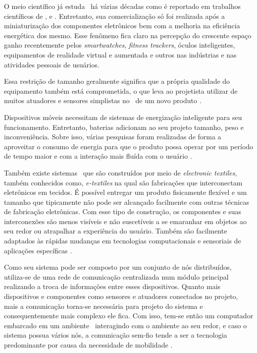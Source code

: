        O meio científico já estuda \wearables\ há várias décadas como é reportado em trabalhos científicos de \citet{Sutherland1968}, \citet{Mann1996} e \citet{Mann1997}.
        Entretanto, sua comercialização só foi realizada após a miniaturização dos componentes eletrônicos bem com a melhoria na eficiência energética dos mesmo.
        Esse fenômeno fica claro na percepção do crescente espaço ganho recentemente pelos \textit{smartwatches}, \textit{fitness trackers}, óculos inteligentes, equipamentos de realidade virtual e aumentada e outros nas indústrias e nas atividades pessoais de usuários.
        
        Essa restrição de tamanho geralmente significa que a própria qualidade do equipamento também está comprometida, o que leva ao projetista utilizar de muitos atuadores e sensores simplistas no \design\ de um novo produto \citep{VanLaerhoven2002}.
        
        Dispositivos móveis necessitam de sistemas de energização inteligente para seu funcionamento.
        Entretanto, baterias adicionam ao seu projeto tamanho, peso e inconveniência.
        Sobre isso, várias pesquisas foram realizadas de forma a aproveitar o consumo de energia para que o produto possa operar por um período de tempo maior e com a interação mais fluída com o usuário \citep{starner1996human}.
        
        
        Também existe sistemas \wearables\ que são construídos por meio de \textit{electronic textiles}, também conhecidos como, \textit{e-textiles} na qual são fabricações que interconectam eletrônicos em tecidos.
        É possível entregar um produto fisicamente flexível e um tamanho que tipicamente não pode ser alcançado facilmente com outras técnicas de fabricação eletrônicas.
        Com esse tipo de construção, os componentes e suas interconexões são menos visíveis e não suscetíveis a se emaranhar em objetos ao seu redor ou atrapalhar a experiência do usuário.
        Também são facilmente adaptados às rápidas mudanças em tecnologias computacionais e sensoriais de aplicações específicas \citep{starner1996human}.
        
        
        Como seu sistema pode ser composto por um conjunto de nós distribuídos, utiliza-se de uma rede de comunicação centralizada num módulo principal realizando a troca de informações entre esses dispositivos.
        Quanto mais dispositivos e componentes como sensores e atuadores conectados no projeto, mais a comunicação torna-se necessária para projeto do sistema e consequentemente mais complexo ele fica.
        Com isso, tem-se então um computador embarcado em um ambiente \mobile\ interagindo com o ambiente ao seu redor, e caso o sistema possua vários nós, a comunicação sem-fio tende a ser a tecnologia predominante por causa da necessidade de mobilidade \citep{Plessl2003,VanLaerhoven2002, Kern2002, Kymissis1998}.

